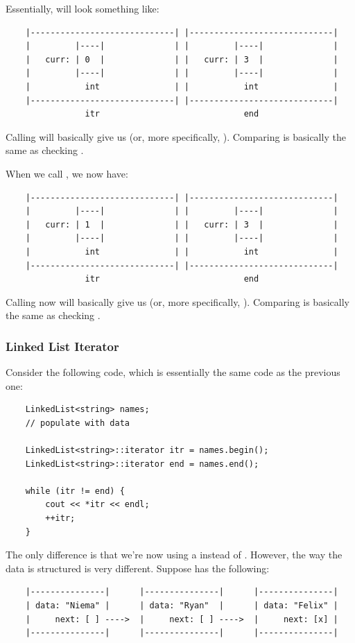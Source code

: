\documentclass[letterpaper]{article}
\begin{document}
Essentially,  will look something like: 
\begin{verbatim}
    |-----------------------------| |-----------------------------|
    |         |----|              | |         |----|              |
    |   curr: | 0  |              | |   curr: | 3  |              |
    |         |----|              | |         |----|              |
    |           int               | |           int               |
    |-----------------------------| |-----------------------------|
                itr                             end
\end{verbatim}
Calling  will basically give us  (or, more specifically, ). Comparing  is basically the same as checking . 

\bigskip 

When we call , we now have: 
\begin{verbatim}
    |-----------------------------| |-----------------------------|
    |         |----|              | |         |----|              |
    |   curr: | 1  |              | |   curr: | 3  |              |
    |         |----|              | |         |----|              |
    |           int               | |           int               |
    |-----------------------------| |-----------------------------|
                itr                             end
\end{verbatim}
Calling  now will basically give us  (or, more specifically, ). Comparing  is basically the same as checking . 

\subsubsection{Linked List Iterator}
Consider the following code, which is essentially the same code as the previous one: 
\begin{verbatim}
    LinkedList<string> names; 
    // populate with data 

    LinkedList<string>::iterator itr = names.begin(); 
    LinkedList<string>::iterator end = names.end(); 
    
    while (itr != end) {
        cout << *itr << endl; 
        ++itr; 
    }
\end{verbatim}
The only difference is that we're now using a  instead of . However, the way the data is structured is very different. Suppose  has the following: 
\begin{verbatim}
    |---------------|      |---------------|      |---------------|
    | data: "Niema" |      | data: "Ryan"  |      | data: "Felix" |
    |     next: [ ] ---->  |     next: [ ] ---->  |     next: [x] |
    |---------------|      |---------------|      |---------------|
\end{verbatim}
\end{document}
